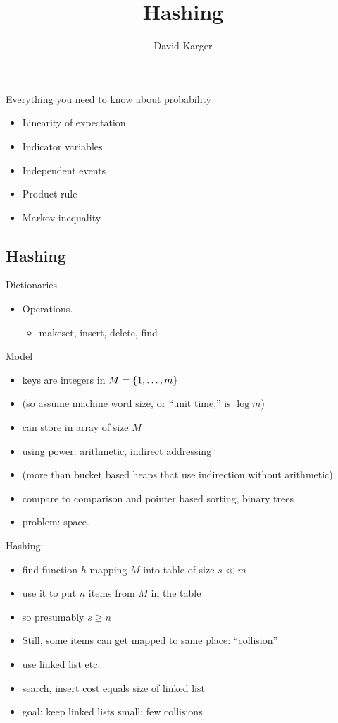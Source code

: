 \documentclass[12pt]{article}
\title{Hashing}
\author{David Karger}
\begin{document}

Everything you need to know about probability
\begin{itemize}
\item Linearity of expectation
\item Indicator variables
\item Independent events
\item Product rule
\item Markov inequality
\end{itemize}

\subsection*{Hashing}

Dictionaries
\begin{itemize} 
   \item Operations.   
      \begin{itemize} 
      \item makeset, insert, delete, find
      \end{itemize}
\end{itemize}

Model
\begin{itemize}
\item keys are integers in $M=\{ 1,\ldots,m \}$ 
\item (so assume machine word size, or ``unit time,'' is $\log m$)
\item can store in array of size $M$
\item using power: arithmetic, indirect addressing
\item (more than bucket based heaps that use indirection without arithmetic)
\item compare to comparison and pointer based sorting, binary trees
\item problem: space.
\end{itemize}

Hashing:
\begin{itemize}
\item find function $h$ mapping $M$ into table of size $s \ll m$
\item use it to put $n$ items from $M$ in the table 
\item so presumably $s \ge n$
\item Still, some items can get mapped to same place: ``collision''
\item use linked list etc.
\item search, insert cost equals size of linked list
\item goal: keep linked lists small: few collisions
\end{itemize}
\end{document}
